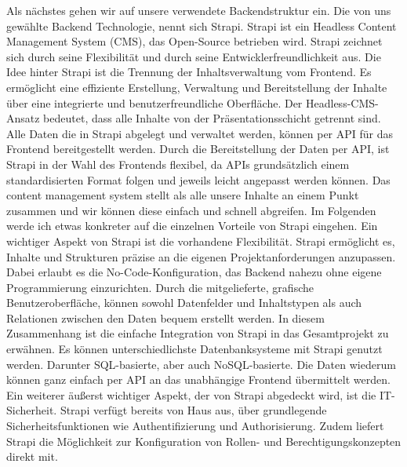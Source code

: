 Als nächstes gehen wir auf unsere verwendete Backendstruktur ein. Die von uns gewählte Backend Technologie, nennt sich Strapi.
Strapi ist ein Headless Content Management System (CMS), das Open-Source betrieben wird. Strapi zeichnet sich durch seine Flexibilität und durch seine Entwicklerfreundlichkeit aus. Die Idee hinter Strapi ist die Trennung der Inhaltsverwaltung vom Frontend.
Es ermöglicht eine effiziente Erstellung, Verwaltung und Bereitstellung der Inhalte über eine integrierte und benutzerfreundliche Oberfläche. Der Headless-CMS-Ansatz bedeutet, dass alle Inhalte von der Präsentationsschicht getrennt sind. Alle Daten die in Strapi abgelegt und verwaltet werden, können per API für das Frontend bereitgestellt werden.
Durch die Bereitstellung der Daten per API, ist Strapi in der Wahl des Frontends flexibel, da APIs grundsätzlich einem standardisierten Format folgen und jeweils leicht angepasst werden können. Das content management system stellt als alle unsere Inhalte an einem Punkt zusammen und wir können diese einfach und schnell abgreifen.
Im Folgenden werde ich etwas konkreter auf die einzelnen Vorteile von Strapi eingehen.
Ein wichtiger Aspekt von Strapi ist die vorhandene Flexibilität. Strapi ermöglicht es, Inhalte und Strukturen präzise an die eigenen Projektanforderungen anzupassen. Dabei erlaubt es die No-Code-Konfiguration, das Backend nahezu ohne eigene Programmierung einzurichten. Durch die mitgelieferte, grafische Benutzeroberfläche, können sowohl Datenfelder und Inhaltstypen als auch Relationen zwischen den Daten bequem erstellt werden.
In diesem Zusammenhang ist die einfache Integration von Strapi in das Gesamtprojekt zu erwähnen. Es können unterschiedlichste Datenbanksysteme mit Strapi genutzt werden. Darunter SQL-basierte, aber auch NoSQL-basierte. Die Daten wiederum können ganz einfach per API an das unabhängige Frontend übermittelt werden.
Ein weiterer äußerst wichtiger Aspekt, der von Strapi abgedeckt wird, ist die IT-Sicherheit. Strapi verfügt bereits von Haus aus, über grundlegende Sicherheitsfunktionen wie Authentifizierung und Authorisierung. Zudem liefert Strapi die Möglichkeit zur Konfiguration von Rollen- und Berechtigungskonzepten direkt mit.